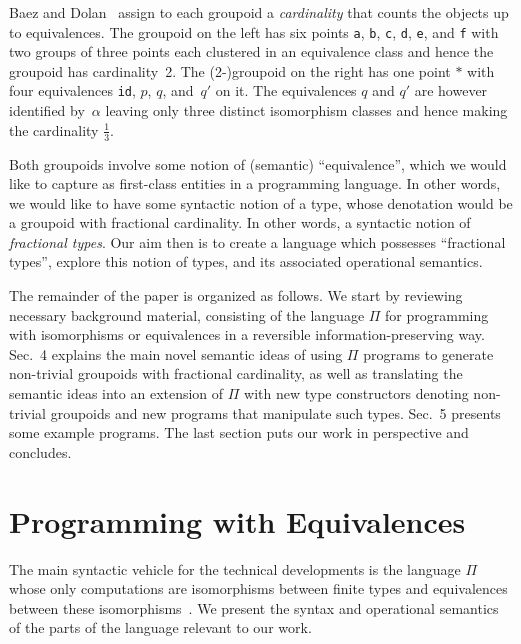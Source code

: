 \documentclass[a4paper,USenglish]{lipics-v2016-utf8x}
\begin{document}
\medskip\noindent Baez and Dolan~\cite{groupoidcard} assign to each groupoid a
\emph{cardinality} that counts the objects up to equivalences. The groupoid on
the left has six points \texttt{a}, \texttt{b}, \texttt{c}, \texttt{d},
\texttt{e}, and \texttt{f} with two groups of three points each clustered in an
equivalence class and hence the groupoid has cardinality~2. The (2-)groupoid on
the right has one point $\ast$ with four equivalences \texttt{id}, $p$, $q$,
and~$q'$ on it. The equivalences $q$ and $q'$ are however identified by~$\alpha$
leaving only three distinct isomorphism classes and hence making the cardinality
$\frac{1}{3}$.

Both groupoids involve some notion of (semantic) ``equivalence'', which we
would like to capture as first-class entities in a programming language.
In other words, we would like to have some syntactic notion of a type, whose
denotation would be a groupoid with fractional cardinality.  In other words,
a syntactic notion of \emph{fractional types}. Our aim then is to create a
language which possesses ``fractional types'', explore this notion of types,
and its associated operational semantics.

The remainder of the paper is organized as follows. We start by reviewing
necessary background material, consisting of the language $\Pi$ for programming
with isomorphisms or equivalences in a reversible information-preserving way.
Sec.~4 explains the main novel semantic ideas of using $\Pi$ programs to
generate non-trivial groupoids with fractional cardinality, as well as
translating the semantic ideas into an extension of $\Pi$ with new type
constructors denoting non-trivial groupoids and new programs that manipulate
such types.  Sec.~5 presents some example programs.  The last section puts our
work in perspective and concludes.

\section{Programming with Equivalences}
\label{sec:pi}

The main syntactic vehicle for the technical developments
is the language $\Pi$ whose only computations are isomorphisms
between finite types and equivalences between these
isomorphisms~\cite{Carette2016,James:2012:IE:2103656.2103667}. We
present the syntax and operational semantics of the parts of the
language relevant to our work.
\end{document}
